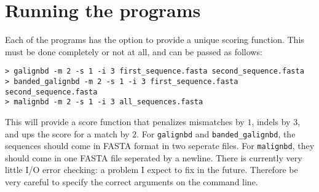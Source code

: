 \documentclass[11pt]{article}
\newcommand{\prog}[1]{\texttt{#1}}
\begin{document}
\section{Running the programs}

Each of the programs has the option to provide a unique scoring function.
This must be done completely or not at all, and can be passed as follows:

\begin{verbatim}
> galignbd -m 2 -s 1 -i 3 first_sequence.fasta second_sequence.fasta
> banded_galignbd -m 2 -s 1 -i 3 first_sequence.fasta second_sequence.fasta
> malignbd -m 2 -s 1 -i 3 all_sequences.fasta
\end{verbatim}

This will provide a score function that penalizes mismatches by $1$, indels
by $3$, and ups the score for a match by $2$. For \prog{galignbd} and 
\prog{banded\_galignbd}, the sequences should come in FASTA format in two
seperate files. For \prog{malignbd}, they should come in one FASTA file
seperated by a newline. There is currently very little I/O error checking:
a problem I expect to fix in the future. Therefore be very careful to specify
the correct arguments on the command line.
\end{document}
